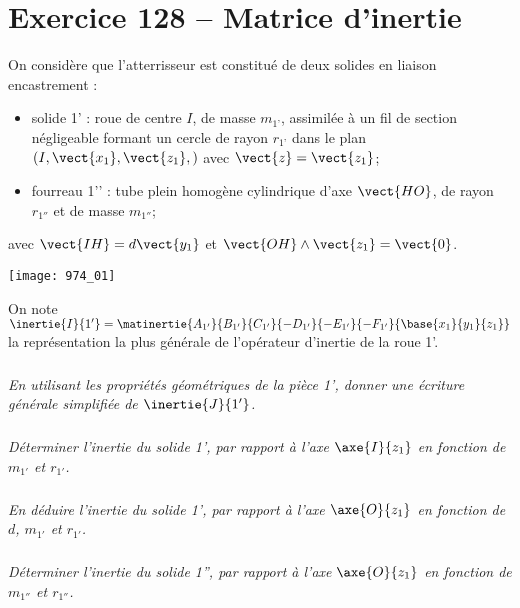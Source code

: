 \section*{Exercice 128 -- Matrice d'inertie}
\setcounter{exo}{0}
On considère que l’atterrisseur est constitué de deux solides en liaison encastrement :
\begin{itemize}
\item solide 1’ : roue de centre $I$, de masse $m_{1’}$, assimilée à un fil de section négligeable formant un cercle de rayon $r_{1’}$ dans le plan $\left(I,\vect{x_1},\vect{z_1}, \right)$ avec $\vect{z}=\vect{z_1}$;
\item fourreau 1’’ : tube plein homogène cylindrique d’axe $\vect{HO}$, de rayon $r_{1''}$ et de masse $m_{1''}$;
 \end{itemize}
avec $\vect{IH}=d\vect{y_1}$ et $\vect{OH}\wedge \vect{z_1}=\vect{0}$.

\begin{center}
\texttt{[image: 974\_01]}%
\end{center}


On note $\inertie{I}{1'}=\matinertie{A_{1'}}{B_{1'}}{C_{1'}}{-D_{1'}}{-E_{1'}}{-F_{1'}}{\base{x_1}{y_1}{z_1}}$ 
la représentation la plus générale de l’opérateur d’inertie de la roue 1'.


\subparagraph{}
\textit{En utilisant les propriétés géométriques de la pièce 1’, donner une écriture générale simplifiée de $\inertie{J}{1'}$.}
\ifprof
\begin{corrige}
\end{corrige}
\else
\fi

\subparagraph{}
\textit{Déterminer l’inertie du solide 1’, par rapport à l’axe $\axe{I}{z_1}$ en fonction de $m_{1'}$ et $r_{1'}$.}
\ifprof
\begin{corrige}
\end{corrige}
\else
\fi

\subparagraph{}
\textit{En déduire l’inertie du solide 1’, par rapport à l’axe $\axe{O}{z_1}$ en fonction de $d$, $m_{1'}$ et $r_{1'}$.}
\ifprof
\begin{corrige}
\end{corrige}
\else
\fi

\subparagraph{}
\textit{Déterminer l’inertie du solide 1'', par rapport à l’axe $\axe{O}{z_1}$ en fonction de $m_{1''}$ et $r_{1''}$.}
\ifprof
\begin{corrige}
\end{corrige}
\else
\fi


